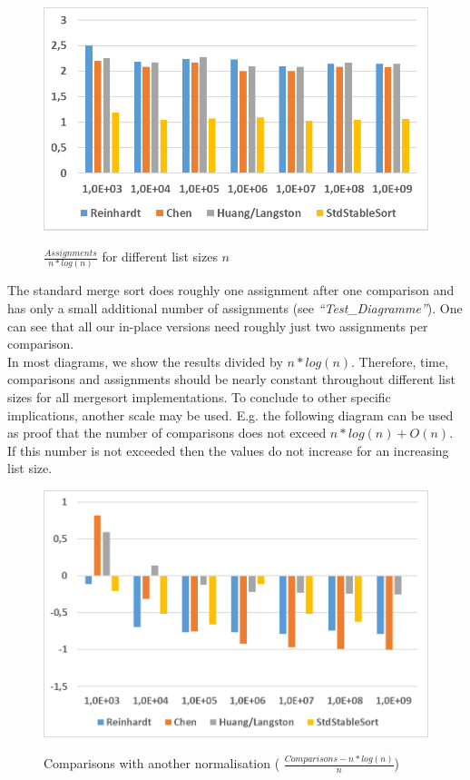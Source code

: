 \documentclass[11pt,pdftex,a4paper, twocolumn]{article}
\begin{document}
\begin{figure}[H]
\includegraphics[width=\linewidth]{Diagramm-Bilder/ints-assignments.JPG} \\
\caption{ $ \frac{Assignments}{n*log(n)} $ for different list sizes $ n $ } \label{fig:ints-assign}
\end{figure}
The standard merge sort does roughly one assignment after one comparison and has only a small additional number of assignments (see \textit{“Test\_Diagramme”}). One can see that all our in-place versions need roughly just two assignments per comparison. \\
In most diagrams, we show the results divided by $ n*log(n) $. Therefore, time, comparisons and assignments should be nearly constant throughout different list sizes for all mergesort implementations. To conclude to other specific implications, another scale may be used. E.g. the following diagram can be used as proof that the number of comparisons does not exceed $ n*log(n) + O(n) $. If this number is not exceeded then the values do not increase for an increasing list size. \\
\begin{figure}[H]
\includegraphics[width=\linewidth]{Diagramm-Bilder/ints-time-otherNormalization.JPG} \\
\caption{Comparisons with another normalisation ( $ \frac{Comparisons - n*log(n)}{n} $)} \label{fig:ints-time-otherNormalization}
\end{figure}
\end{document}
